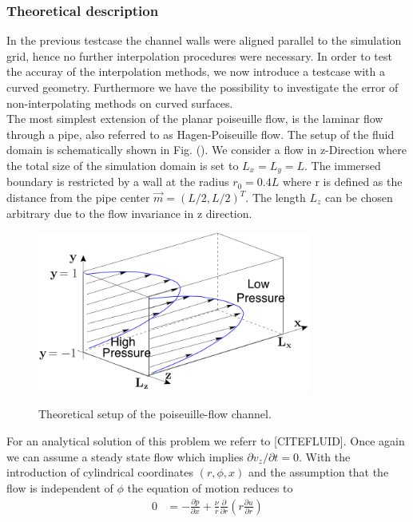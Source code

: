 \subsubsection{Theoretical description}

In the previous testcase the channel walls were aligned parallel to the simulation grid, hence no further interpolation procedures
were necessary. In order to test the accuray of the interpolation methods, we now introduce a testcase with a curved geometry.
Furthermore we have the possibility to investigate the error of non-interpolating methods on curved surfaces.\\
The most simplest extension of the planar poiseuille flow, is the laminar flow through a pipe,
also referred to as Hagen-Poiseuille flow. The setup of the fluid domain is schematically shown in Fig. ().
We consider a flow in z-Direction where the total size of the simulation domain is set to $L_x = L_y = L$.
The immersed boundary is restricted by a wall at the radius $r_0=0.4L$ where r is defined as the distance from the pipe center $\vec{m} = (L/2, L/2)^T$.
The length $L_z$ can be chosen arbitrary due to the flow invariance in z direction.\\
\begin{figure}[!bp]
  \centering
  \includegraphics[width=0.8\textwidth]{gfx/immersed_boundary/val_volpen/poiseuilleflow.png}\label{b}
  \caption{Theoretical setup of the poiseuille-flow channel.}
\end{figure}
For an analytical solution of this problem we referr to [CITEFLUID].
Once again we can assume a steady state flow which implies $\partial v_z/\partial t = 0$. With the introduction of cylindrical coordinates $(r, \phi, x)$
and the assumption that the flow is independent of $\phi$ the equation of motion reduces to
\begin{align}
        0 &= - \frac{\partial p}{\partial x}  +  \frac{\nu}{r}\frac{\partial}{\partial r}\left(r\frac{\partial u}{\partial r}\right)
\end{align}
